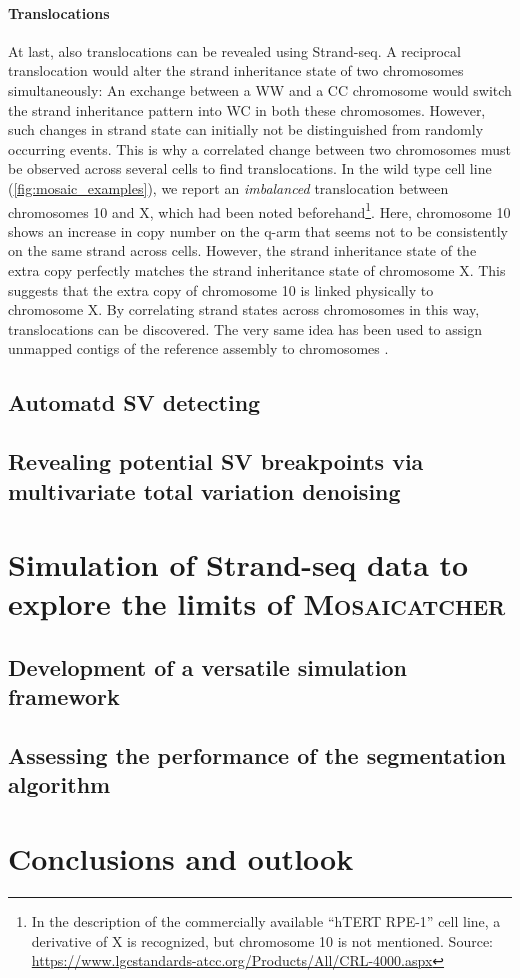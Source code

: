 \paragraph{Translocations}
At last, also translocations can be revealed using Strand-seq.  A reciprocal
translocation would alter the strand inheritance state of two chromosomes
simultaneously: An exchange between a WW and a CC chromosome would switch the
strand inheritance pattern into WC in both these chromosomes. However, such
changes in strand state can initially not be distinguished from randomly
occurring \sce events. This is why a correlated change between two chromosomes
must be observed across several cells to find translocations. In the \rpe wild
type cell line (\cref{fig:mosaic_examples}), we report an \emph{imbalanced}
translocation between chromosomes 10 and X, which had been noted
beforehand\footnote{In the description of the commercially available
    ``hTERT RPE-1'' cell line, a derivative of X is recognized, but chromosome
    10 is not mentioned. Source: \url{https://www.lgcstandards-atcc.org/Products/All/CRL-4000.aspx}}.
Here, chromosome 10 shows an increase in copy number on the q-arm that seems not
to be consistently on the same strand across cells. However, the strand
inheritance state of the extra copy perfectly matches the strand inheritance
state of chromosome X. This suggests that the extra copy of chromosome 10 is
linked physically to chromosome X. By correlating strand states across
chromosomes in this way, translocations can be discovered. The very same idea
has been used to assign unmapped contigs of the reference assembly to
chromosomes \citep{Hills2013}.







\FloatBarrier
\subsection{Automatd SV detecting}
\label{sec:mosaic_method}



\subsection{Revealing potential SV breakpoints via multivariate total variation denoising}
\label{sec:mosaic_segmentation}


\FloatBarrier
\section{Simulation of Strand-seq data to explore the limits of \textsc{Mosaicatcher}}
\label{sec:mosaic_simul}

\subsection{Development of a versatile simulation framework}

\subsection{Assessing the performance of the segmentation algorithm}

\section{Conclusions and outlook}
\label{sec:mosaic_conclusion}


